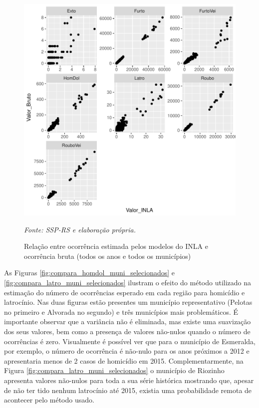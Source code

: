 \documentclass[12pt,openright,oneside,a4paper,english,french,spanish]{abntex2}
\numberwithin{table}{section} %
\numberwithin{figure}{section} %
\newcommand{\source}[1]{\textit{#1}}
\begin{document}
\begin{figure}
\begin{center}
\includegraphics{TESE_DE_DOUTORADO_RENAN_FINAL-plot7}
\end{center}
\caption{Relação entre ocorrência estimada pelos modelos do INLA e ocorrência bruta (todos os anos e todos os municípios)}
\source{Fonte: SSP-RS e elaboração própria.}
\label{fig:rela_INLA_Bruto}
\end{figure}


As Figuras \ref{fig:compara_homdol_muni_selecionados} e \ref{fig:compara_latro_muni_selecionados} ilustram o efeito do método utilizado na estimação do número de ocorrências esperado em cada região para homicídio e latrocínio. Nas duas figuras estão presentes um município representativo (Pelotas no primeiro e Alvorada no segundo) e três municípios mais problemáticos. É importante observar que a variância não é eliminada, mas existe uma suavização dos seus valores, bem como a presença de valores não-nulos quando o número de ocorrências é zero. Visualmente é possível ver que para o município de Esmeralda, por exemplo, o número de ocorrência é não-nulo para os anos próximos a 2012 e apresentaria menos de 2 casos de homicídio em 2015. Complementarmente, na Figura \ref{fig:compara_latro_muni_selecionados} o município de Riozinho apresenta valores não-nulos para toda a sua série histórica mostrando que, apesar de não ter tido nenhum latrocínio até 2015, existia uma probabilidade remota de acontecer pelo método usado.
\end{document}
